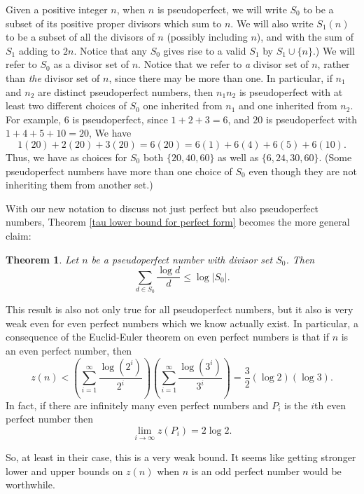 \documentclass{article}
\newtheorem{theorem}{Theorem}
\begin{document}
Given a positive integer $n$, when $n$ is pseudoperfect, we will write $S_0$  to be a subset of its positive proper divisors which sum to $n$. We will also write $S_1(n)$ to be a subset of all the divisors of $n$ (possibly including $n$), and with the sum of $S_1$ adding to $2n$. Notice that any $S_0$ gives rise to a valid $S_1$ by $S_1 \cup \{n\}$.)  We will refer to $S_0$  as a divisor set of $n$. Notice that we refer to {\emph{a}} divisor set of $n$, rather than {\emph{the}} divisor set of $n$, since there may be more than one. In particular, if $n_1$ and $n_2$ are distinct pseudoperfect numbers, then $n_1n_2$ is pseudoperfect with at least two different choices of $S_0$ one inherited from $n_1$ and one inherited from $n_2$. For example, 6 is pseudoperfect, since $1+2+3=6$, and $20$ is pseudoperfect with $1+4+5+10=20$, We have  $$1(20)+2(20)+3(20)=6(20)=6(1)+6(4)+6(5)+6(10).$$
Thus, we have as choices for $S_0$ both $\{20,40,60\}$ as well as $\{6, 24, 30, 60\}$. (Some pseudoperfect numbers have more than one choice of $S_0$ even though they are not inheriting them from another set.)

With our new notation to discuss not just perfect but also pseudoperfect numbers,  Theorem \ref{tau lower bound for perfect form}  becomes the more general claim:

\begin{theorem} Let $n$ be a pseudoperfect number with divisor set $S_0$. Then $$\sum_{d \in S_0} \frac{\log d}{d} \leq  \log |S_0|. $$
\end{theorem}

This result is also not only true for all pseudoperfect numbers, but it also is very weak even for even perfect numbers which we know actually exist. In particular, a consequence of the Euclid-Euler theorem on even perfect numbers is that if $n$ is an even perfect number, then $$z(n) < \left(\sum_{i=1}^\infty \frac{\log (2^i)}{2^i}\right)\left(\sum_{i=1}^\infty \frac{\log (3^i)}{3^i}\right) = \frac{3}{2}(\log 2)(\log 3).$$
In fact, if there are infinitely many even perfect numbers and $P_i$ is the $i$th even perfect number then $$\lim_{i \rightarrow \infty} z(P_i) = 2\log 2.$$

So, at least in their case, this is a very weak bound. It seems like getting stronger lower and upper bounds on $z(n)$ when $n$ is an odd perfect number would be worthwhile.
\end{document}
